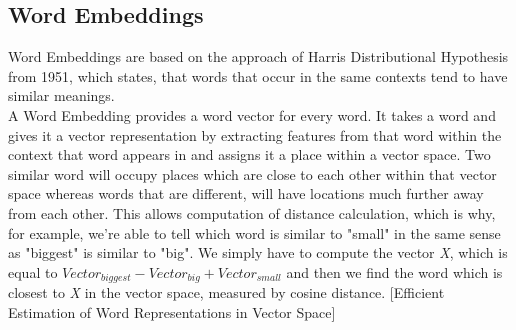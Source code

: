 \documentclass[a4paper, 11pt,titlepage,oneside,openany]{book}
\begin{document}
\subsection{Word Embeddings}
Word Embeddings are based on the approach of Harris Distributional Hypothesis from 1951, which states, that words that occur in the same contexts tend to have similar meanings. \\
\noindent A Word Embedding provides a word vector for every word. It takes a word and gives it a vector representation by extracting features from that word within the context that word appears in and assigns it a place within a vector space. Two similar word will occupy places which are close to each other within that vector space whereas words that are different, will have locations much further away from each other. This allows computation of distance calculation, which is why, for example, we're able to tell which word is similar to "small" in the same sense as "biggest" is similar to "big". We simply have to compute the vector \textit{X}, which is equal to $Vector_{biggest}-Vector_{big}+Vector_{small}$ and then we find the word which is closest to \textit{X} in the vector space, measured by cosine distance. [Efficient Estimation of Word Representations in Vector Space]
\end{document}
